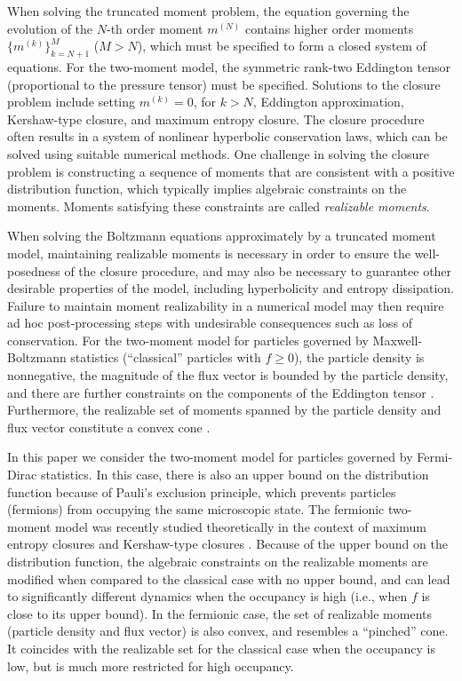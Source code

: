When solving the truncated moment problem, the equation governing the evolution of the $N$-th order moment $m^{(N)}$ contains higher order moments $\{m^{(k)}\}_{k=N+1}^{M}$ ($M>N$), which must be specified to form a closed system of equations.  
For the two-moment model, the symmetric rank-two Eddington tensor (proportional to the pressure tensor) must be specified.  
Solutions to the closure problem include setting $m^{(k)}=0$, for $k>N$, Eddington approximation, Kershaw-type closure, and maximum entropy closure.  
The closure procedure often results in a system of nonlinear hyperbolic conservation laws, which can be solved using suitable numerical methods.  
One challenge in solving the closure problem is constructing a sequence of moments that are consistent with a positive distribution function, which typically implies algebraic constraints on the moments.  
Moments satisfying these constraints are called \emph{realizable moments}.  

When solving the Boltzmann equations approximately by a truncated moment model, maintaining realizable moments is necessary in order to ensure the well-posedness of the closure procedure, and may also be necessary to guarantee other desirable properties of the model, including hyperbolicity and entropy dissipation.  
Failure to maintain moment realizability in a numerical model may then require ad hoc post-processing steps with undesirable consequences such as loss of conservation.  
For the two-moment model for particles governed by Maxwell-Boltzmann statistics (``classical'' particles with $f\ge0$), the particle density is nonnegative, the magnitude of the flux vector is bounded by the particle density, and there are further constraints on the components of the Eddington tensor \cite{levermore_1984}.  
Furthermore, the realizable set of moments spanned by the particle density and flux vector constitute a convex cone \cite{olbrant_etal_2012}.  

In this paper we consider the two-moment model for particles governed by Fermi-Dirac statistics.  
In this case, there is also an upper bound on the distribution function because of Pauli's exclusion principle, which prevents particles (fermions) from occupying the same microscopic state.  
The fermionic two-moment model was recently studied theoretically in the context of maximum entropy closures \cite{lareckiBanach_2011,banachLarecki_2013,banachLarecki_2017b} and Kershaw-type closures \cite{banachLarecki_2017a}.  
Because of the upper bound on the distribution function, the algebraic constraints on the realizable moments are modified when compared to the classical case with no upper bound, and can lead to significantly different dynamics when the occupancy is high (i.e., when $f$ is close to its upper bound).  
In the fermionic case, the set of realizable moments (particle density and flux vector) is also convex, and resembles a ``pinched'' cone.  
It coincides with the realizable set for the classical case when the occupancy is low, but is much more restricted for high occupancy.  

